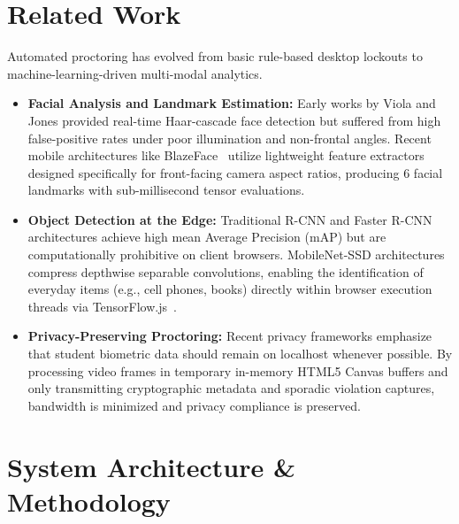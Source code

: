 \documentclass[conference]{IEEEtran}
\begin{document}
\section{Related Work}
Automated proctoring has evolved from basic rule-based desktop lockouts to machine-learning-driven multi-modal analytics.
\begin{itemize}
    \item \textbf{Facial Analysis and Landmark Estimation:} Early works by Viola and Jones provided real-time Haar-cascade face detection but suffered from high false-positive rates under poor illumination and non-frontal angles. Recent mobile architectures like BlazeFace~\cite{blazeface} utilize lightweight feature extractors designed specifically for front-facing camera aspect ratios, producing 6 facial landmarks with sub-millisecond tensor evaluations.
    \item \textbf{Object Detection at the Edge:} Traditional R-CNN and Faster R-CNN architectures achieve high mean Average Precision (mAP) but are computationally prohibitive on client browsers. MobileNet-SSD architectures~\cite{mobilenet} compress depthwise separable convolutions, enabling the identification of everyday items (e.g., cell phones, books) directly within browser execution threads via TensorFlow.js~\cite{tfjs}.
    \item \textbf{Privacy-Preserving Proctoring:} Recent privacy frameworks emphasize that student biometric data should remain on localhost whenever possible. By processing video frames in temporary in-memory HTML5 Canvas buffers and only transmitting cryptographic metadata and sporadic violation captures, bandwidth is minimized and privacy compliance is preserved.
\end{itemize}

\section{System Architecture \& Methodology}
\end{document}
